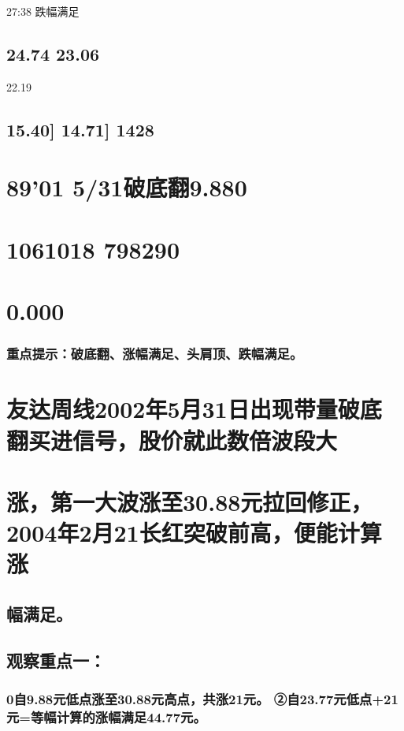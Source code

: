 \documentclass{article}
\begin{document}
27:38 跌幅满足

\subsection{24.74 23.06}

22.19

\subsection{15.40] 14.71] 1428}

\section{89'01 5/31破底翻9.880}

\section{1061018 798290}

\section{0.000}

\subsubsection{重点提示：破底翻、涨幅满足、头肩顶、跌幅满足。}

\section{友达周线2002年5月31日出现带量破底翻买进信号，股价就此数倍波段大}

\section{涨，第一大波涨至30.88元拉回修正，2004年2月21长红突破前高，便能计算涨}

\subsection{幅满足。}

\subsection{观察重点一：}

\subsubsection{0自9.88元低点涨至30.88元高点，共涨21元。 ②自23.77元低点+21元=等幅计算的涨幅满足44.77元。}
\end{document}
